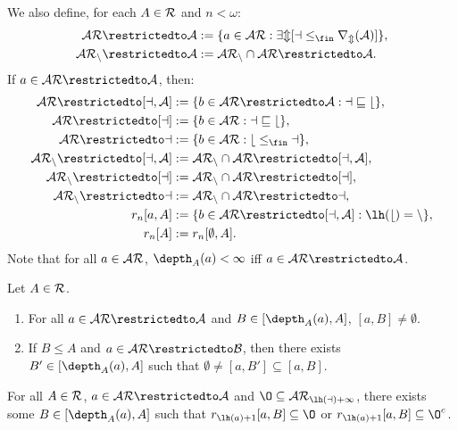\documentclass[11pt,reqno]{amsart}
\begin{document}
We also define, for each $A \in \cal{R}$ and $n < \omega$:
\begin{align*}
    \cal{AR}\restrictedto A &:= \{a \in \cal{AR} : \exists m[a \leq_\fin r_m(A)]\}, \\
    \cal{AR}_n\restrictedto A &:= \cal{AR}_n \cap \cal{AR}\restrictedto A.
\end{align*}
If $a \in \cal{AR}\restrictedto A$, then:
\begin{align*}
    \cal{AR}\restrictedto[a,A] &:= \{b \in \cal{AR}\restrictedto A : a \sqsubseteq b\}, \\
    \cal{AR}\restrictedto[a] &:= \{b \in \cal{AR} : a \sqsubseteq b\}, \\
    \cal{AR}\restrictedto a &:= \{b \in \cal{AR} : b \leq_\fin a\},  \\
    \cal{AR}_n\restrictedto[a,A] &:= \cal{AR}_n \cap \cal{AR}\restrictedto[a,A], \\
    \cal{AR}_n\restrictedto[a] &:= \cal{AR}_n \cap \cal{AR}\restrictedto[a], \\
    \cal{AR}_n\restrictedto a &:= \cal{AR}_n \cap \cal{AR}\restrictedto a, \\
    r_n[a,A] &:= \{b \in \cal{AR}\restrictedto[a,A] : \lh(b) = n\}, \\
    r_n[A] &:= r_n[\emptyset,A].
\end{align*}
Note that for all $a \in \cal{AR}$, $\depth_A(a) < \infty$ iff $a \in \cal{AR}\restrictedto A$. 

\begin{axiom}
    Let $A \in \cal{R}$.
    \begin{enumerate}[label=(\arabic*)]
        \item For all $a \in \cal{AR}\restrictedto A$ and $B \in [\depth_A(a),A]$, $[a,B] \neq \emptyset$.

        \item If $B \leq A$ and $a \in \cal{AR}\restrictedto B$, then there exists $B' \in [\depth_A(a),A]$ such that $\emptyset \neq [a,B'] \subseteq [a,B]$.
    \end{enumerate}
\end{axiom}

\begin{axiom}
    For all $A \in \cal{R}$, $a \in \cal{AR}\restrictedto A$ and $\O \subseteq \cal{AR}_{\lh(a)+1}$, there exists some $B \in [\depth_A(a),A]$ such that $r_{\lh(a)+1}[a,B] \subseteq \O$ or $r_{\lh(a)+1}[a,B] \subseteq \O^c$.
\end{axiom}
\end{document}
